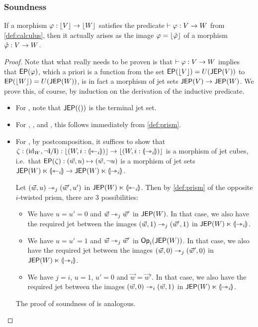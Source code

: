 \documentclass[a4paper]{memoir}
\begin{document}
\subsubsection{Soundness}
\begin{theorem}[Soundness] \label{thm:calculus-sound}
	If a morphism $\varphi : \mathopen{}\left\lfloor V \right\rfloor\mathclose{} \to \mathopen{}\left\lfloor W \right\rfloor\mathclose{}$ satisfies the predicate $\vdash \varphi : V \to W$ from \cref{def:calculus}, then it actually arises as the image $\varphi = \mathopen{}\left\lfloor \hat {\varphi} \right\rfloor\mathclose{}$ of a morphism $\hat {\varphi} : V \to W$.
\end{theorem}
\begin{proof}
	Note that what really needs to be proven is that $\vdash \varphi : V \to W$ implies that $\mathsf{EP}(\varphi)$, which a priori is a function from the set $\mathsf{EP}(\mathopen{}\left\lfloor V \right\rfloor\mathclose{}) = U(\mathsf{JEP}(V))$ to $\mathsf{EP}(\mathopen{}\left\lfloor W \right\rfloor\mathclose{}) = U(\mathsf{JEP}(W))$, is in fact a morphism of jet sets $\mathsf{JEP}(V) \to \mathsf{JEP}(W)$.
	We prove this, of course, by induction on the derivation of the inductive predicate.
	
	\begin{itemize}
		\item For , note that $\mathsf{JEP}(())$ is the terminal jet set.
	
		\item For , ,  and , this follows immediately from \cref{def:prism}.
		
		\item For , by postcomposition, it suffices to show that $\zeta : (\mathrm{id}_W, \lnot \mathbf{i} / \mathbf{i}) : \mathopen{}\left\lfloor (W, i : {\llparenthesis \leftarrowtriangle_i \rrparenthesis}) \right\rfloor\mathclose{} \to \mathopen{}\left\lfloor (W, i : {\llparenthesis \rightarrowtriangle_i \rrparenthesis}) \right\rfloor\mathclose{}$ is a morphism of jet cubes, i.e.\ that $\mathsf{EP}(\zeta) : (\vec w, u) \mapsto (\vec w, \lnot u)$ is a morphism of jet sets $\mathsf{JEP}(W) \ltimes {\llparenthesis \leftarrowtriangle_i \rrparenthesis} \to \mathsf{JEP}(W) \ltimes {\llparenthesis \rightarrowtriangle_i \rrparenthesis}$.
		
		Let $(\vec w, u) \rightarrowtriangle_j (\vec w', u')$ in $\mathsf{JEP}(W) \ltimes {\llparenthesis \leftarrowtriangle_i \rrparenthesis}$. Then by \cref{def:prism} of the opposite $i$-twisted prism, there are 3 possibilities:
		\begin{itemize}
			\item We have $u = u' = 0$ and $\vec w \rightarrowtriangle_j \vec w'$ in $\mathsf{JEP}(W)$.
			In that case, we also have the required jet between the images $(\vec w, 1) \rightarrowtriangle_j (\vec w', 1)$ in $\mathsf{JEP}(W) \ltimes {\llparenthesis \rightarrowtriangle_i \rrparenthesis}$.
			\item We have $u = u' = 1$ and $\vec w \rightarrowtriangle_j \vec w'$ in ${\mathsf{Op}}_i(\mathsf{JEP}(W))$.
			In that case, we also have the required jet between the images $(\vec w, 0) \rightarrowtriangle_j (\vec w', 0)$ in $\mathsf{JEP}(W) \ltimes {\llparenthesis \rightarrowtriangle_i \rrparenthesis}$.
			\item We have $j = i$, $u = 1$, $u' = 0$ and $\vec w = \vec w'$.
			In that case, we also have the required jet between the images $(\vec w, 0) \rightarrowtriangle_i (\vec w, 1)$ in $\mathsf{JEP}(W) \ltimes {\llparenthesis \rightarrowtriangle_i \rrparenthesis}$.
		\end{itemize}
		The proof of soundness of  is analogous.
		

\end{itemize}
\end{proof}
\end{document}
